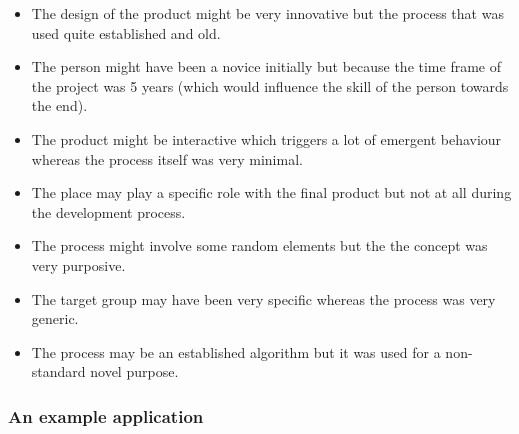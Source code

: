 \begin{itemize}
  \item The design of the product might be very innovative but the process that was used quite established and old.
  \item The person might have been a novice initially but because the time frame of the project was \num{5} years (which would influence the skill of the person towards the end).
  \item The product might be interactive which triggers a lot of emergent behaviour whereas the process itself was very minimal.
  \item The place may play a specific role with the final product but not at all during the development process.
  \item The process might involve some random elements but the the concept was very purposive.
  \item The target group may have been very specific whereas the process was very generic.
  \item The process may be an established algorithm but it was used for a non-standard novel purpose.
\end{itemize}


\subsubsection{An example application}

